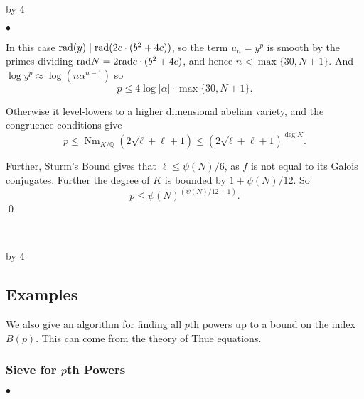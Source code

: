 \documentclass[12pt]{scrartcl}
\newenvironment{citemize}{
\begin{list}{$\bullet$}{\setlength{\itemsep}{0pt} \setlength{\rightmargin}{0pt} \setlength{\leftmargin}{0.5\labelwidth} \setlength{\topsep}{0pt}}
}{\end{list}}
\def\Q{{\mathbb Q}}
\newcommand{\rad}{{\rm{rad}}}
\newcommand{\Nm}{\operatorname{Nm}}
\def\anzspalten{4}
\newlength{\kastenwidth}
\newenvironment{kasten}{%
  \begin{lrbox}{\dummybox}%
    \begin{minipage}{0.96\linewidth}}%
    {\end{minipage}%
  \end{lrbox}%
  \raisebox{-\depth}{\psshadowbox[framesep=1em]{\usebox{\dummybox}}}\\[0.5em]}
\newenvironment{spalte}{%
  \setlength\kastenwidth{1.2\textwidth}
  \divide\kastenwidth by \anzspalten
  \begin{minipage}[t]{\kastenwidth}}{\end{minipage}\hfill}
\begin{document}
\begin{lrbox}{\spalten}
{\begin{spalte}
\begin{kasten}
\begin{citemize}
\item In this case $\rad(y) \mid \rad(2c \cdot (b^2+4c))$, so the term $u_n = y^p$ is smooth by the primes dividing $\rad{N} = 2\rad{c\cdot (b^2+4c)}$, and hence $n < \max\{30, N+1\}$.  And $\log y^p \approx \log(n \alpha^{n-1})$ so
\[p \leq 4 \log |\alpha| \cdot \max\{30, N+1\}. \]

\item Otherwise it level-lowers to a higher dimensional abelian variety, and the congruence conditions give
\[ p \leq \Nm_{K/\Q}(2\sqrt{\ell} +\ell+1) \leq (2\sqrt{\ell} +\ell+1)^{\operatorname{deg}{K}}.\]

\item Further, Sturm's Bound gives that $\ell \leq \psi(N)/6$, as $f$ is not equal to its Galois conjugates.  Further the degree of $K$ is bounded by $1+\psi(N)/12$.  So
\[p \leq \psi(N)^{(\psi(N)/12+1)}.\]
\qed
\end{citemize}

\end{kasten}



\end{spalte}
    \begin{spalte}
\vspace{-2.71in}




\begin{kasten}
  \subsection*{{\color{blue} \large Examples}}


We also give an algorithm for finding all $p$th powers up to a bound on the index $B(p)$.  This can come from the theory of Thue equations.

\subsubsection*{\color{red} Sieve for $p$th Powers}

\begin{citemize}


\end{citemize}
\end{kasten}
\end{spalte}}
\end{lrbox}
\end{document}
